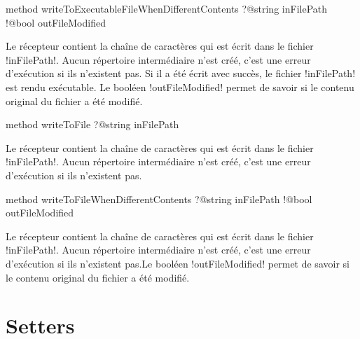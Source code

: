
\begin{galgasbox}
method writeToExecutableFileWhenDifferentContents
    ?@string inFilePath
    !@bool outFileModified
\end{galgasbox}

Le récepteur contient la chaîne de caractères qui est écrit dans le fichier \ggs!inFilePath!. Aucun répertoire intermédiaire n'est créé, c'est une erreur d'exécution si ils n'existent pas. Si il a été écrit avec succès, le fichier \ggs!inFilePath! est rendu exécutable. Le booléen \ggs!outFileModified! permet de savoir si le contenu original du fichier a été modifié.










\begin{galgasbox}
method writeToFile ?@string inFilePath
\end{galgasbox}

Le récepteur contient la chaîne de caractères qui est écrit dans le fichier \ggs!inFilePath!. Aucun répertoire intermédiaire n'est créé, c'est une erreur d'exécution si ils n'existent pas.










\begin{galgasbox}
method writeToFileWhenDifferentContents
    ?@string inFilePath
    !@bool outFileModified
\end{galgasbox}

Le récepteur contient la chaîne de caractères qui est écrit dans le fichier \ggs!inFilePath!. Aucun répertoire intermédiaire n'est créé, c'est une erreur d'exécution si ils n'existent pas.Le booléen \ggs!outFileModified! permet de savoir si le contenu original du fichier a été modifié.















\section{Setters}

